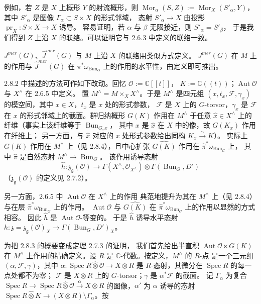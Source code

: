 例如，若 $Z$ 是 $X$ 上概形 $Y$ 的射流概形，则
$\operatorname{Mor}_\alpha(S,Z):=\operatorname{Mor}_X(S'_\alpha,Y)$，
其中 $S'_\alpha$ 是图像 $\Gamma_\alpha\subset S\times X$ 的形式邻域，
态射 $S'_\alpha\to X$ 由投影 $\operatorname{pr}_X:S\times X\to X$ 诱导。
容易证明，若 $\alpha$ 与 $\beta$ 无限接近，则 $S'_\alpha=S'_\beta$，
于是我们得到 $Z$ 上沿 $X$ 的联络。可以证明它与 2.6.3 中定义的联络一致。


$J^{mer}(G)$、$\widehat{J}^{mer}(G)$ 与 $M$ 上沿 $X$ 的联络用类似方式定义。
$J^{mer}(G)$ 在 $M$ 上的作用与 $\widehat{J}^{mer}(G)$ 在
$\pi^*\omega_{\operatorname{Bun}_G}$ 上的作用的水平性，由定义即可推出。

 2.8.2 中描述的方法可作如下改动。回忆 $\mathcal{O}:=\mathbb{C}[[t]]$，
$K:=\mathbb{C}((t))$；$\operatorname{Aut}\mathcal{O}$ 与 $X^\wedge$ 在 2.6.5 中定义。
置 $M^\wedge=M\times_X X^\wedge$。于是 $M^\wedge$ 是四元组
$(x,t_x,\mathcal{F},\gamma_x)$ 的模空间，其中 $x\in X$，$t_x$ 是 $x$ 处的形式参数，
$\mathcal{F}$ 是 $X$ 上的 $G$-torsor，$\gamma_x$ 是 $\mathcal{F}$ 在 $x$
的形式邻域上的截面。群归纳概形 $G(K)$ 作用在 $M^\wedge$ 于任意
$\hat{x}\in X^\wedge$ 上的纤维（事实上该纤维等于 $\operatorname{Bun}_{G,x}$，
其中 $x$ 是 $\hat{x}$ 在 $X$ 中的像，故 $G(K_x)$ 作用在纤维上；
另一方面，与 $\hat{x}$ 对应的 $x$ 处形式参数给出同构 $K_x\xrightarrow{\sim}K$）。
实际上 $G(K)$ 作用在 $M^\wedge$ 上（见 2.8.4），且中心扩张 $\widehat{G(K)}$
作用在 $\hat{\pi}^*\omega_{\operatorname{Bun}_G}$ 上，
其中 $\hat{\pi}$ 是自然态射 $M^\wedge\to\operatorname{Bun}_G$。
该作用诱导态射
\[
  \hat{h}:\mathfrak{z}_{\mathfrak{g}}(\mathcal{O})\longrightarrow
  \Gamma(X^\wedge,\mathcal{O}_{X^\wedge})\otimes\Gamma(\operatorname{Bun}_G,D')
\]
（$\mathfrak{z}_{\mathfrak{g}}(\mathcal{O})$ 的定义见 2.7.2）。

另一方面，2.6.5 中 $\operatorname{Aut}\mathcal{O}$ 在 $X^\wedge$ 上的作用
典范地提升为其在 $M^\wedge$ 上（见 2.8.4）与在层
$\hat{\pi}^*\omega_{\operatorname{Bun}_G}$ 上的作用。
$\operatorname{Aut}\mathcal{O}$ 与 $\widehat{G(K)}$ 在
$\hat{\pi}^*\omega_{\operatorname{Bun}_G}$ 上的作用以显然的方式相容。
因此 $\hat{h}$ 是 $\operatorname{Aut}\mathcal{O}$-等变的。
于是 $\hat{h}$ 诱导水平态射
$h:\mathfrak{z}=\mathfrak{z}_{\mathfrak{g}}(\mathcal{O})_X\to
\Gamma(\operatorname{Bun}_G,D')_X$。

 为把 2.8.3 的概要变成定理 2.7.3 的证明，
我们首先给出半直积 $\operatorname{Aut}\mathcal{O}\ltimes G(K)$ 在 $M^\wedge$
上作用的精确定义。设 $R$ 是 $\mathbb{C}$-代数。按定义，$M^\wedge$ 的 $R$-点
是一个三元组 $(\alpha,\mathcal{F},\gamma)$，其中
$\alpha:\operatorname{Spec} R\widehat{\otimes}\mathcal{O}\to X\otimes R$
是 $R$-态射，其微分在 $\operatorname{Spec} R$ 的每一点处都不为零；
$\mathcal{F}$ 是 $X\otimes R$ 上的 $G$-torsor；$\gamma$ 是 $\alpha^*\mathcal{F}$ 的截面。
记 $\Gamma_\alpha$ 为复合
$\operatorname{Spec} R\to\operatorname{Spec} R\widehat{\otimes}\mathcal{O}
\xrightarrow{\alpha}X\otimes R$ 的图像，$\alpha'$ 为 $\alpha$ 诱导的态射
$\operatorname{Spec} R\widehat{\otimes}K\to(X\otimes R)\setminus\Gamma_\alpha$。按


